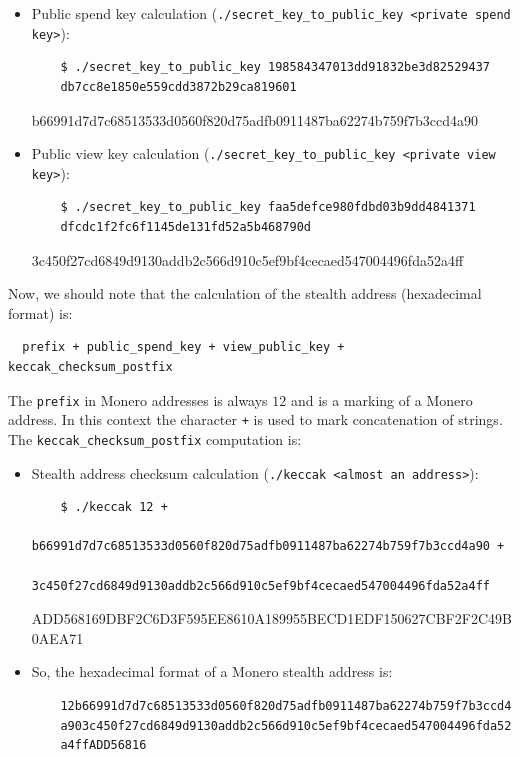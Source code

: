 \begin{itemize}
\begin{tcolorbox}[colback=green!5!white,colframe=green!65!black,title=Output:]
  \end{tcolorbox}
  \item Public spend key calculation (\verb|./secret_key_to_public_key <private spend key>|):
  \begin{verbatim}
    $ ./secret_key_to_public_key 198584347013dd91832be3d82529437
    db7cc8e1850e559cdd3872b29ca819601
  \end{verbatim}
  \begin{tcolorbox}[colback=green!5!white,colframe=green!65!black,title=Output:]
    \small{b66991d7d7c68513533d0560f820d75adfb0911487ba62274b759f7b3ccd4a90}
  \end{tcolorbox}
  \item Public view key calculation (\verb|./secret_key_to_public_key <private view key>|):
  \begin{verbatim}
    $ ./secret_key_to_public_key faa5defce980fdbd03b9dd4841371
    dfcdc1f2fc6f1145de131fd52a5b468790d
  \end{verbatim}
  \begin{tcolorbox}[colback=green!5!white,colframe=green!65!black,title=Output:]
    \small{3c450f27cd6849d9130addb2c566d910c5ef9bf4cecaed547004496fda52a4ff}
  \end{tcolorbox}
\end{itemize}

Now, we should note that the calculation of the stealth address (hexadecimal format) is:
\begin{verbatim}
  prefix + public_spend_key + view_public_key + keccak_checksum_postfix
\end{verbatim}
The \verb|prefix| in Monero addresses is always $12$ and is a marking of a Monero address. In this context the character \verb|+| is used to mark concatenation of strings. The \verb|keccak_checksum_postfix| computation is:
\begin{itemize}
  \item Stealth address checksum calculation (\verb|./keccak <almost an address>|):
  \begin{verbatim}
    $ ./keccak 12 +
    b66991d7d7c68513533d0560f820d75adfb0911487ba62274b759f7b3ccd4a90 +
    3c450f27cd6849d9130addb2c566d910c5ef9bf4cecaed547004496fda52a4ff
  \end{verbatim}
  \begin{tcolorbox}[colback=green!5!white,colframe=green!65!black,title=Output:]
    \footnotesize{ADD568169DBF2C6D3F595EE8610A189955BECD1EDF150627CBF2F2C49B0AEA71}
  \end{tcolorbox}
  \item So, the hexadecimal format of a Monero stealth address is:
  \begin{verbatim}
    12b66991d7d7c68513533d0560f820d75adfb0911487ba62274b759f7b3ccd4
    a903c450f27cd6849d9130addb2c566d910c5ef9bf4cecaed547004496fda52
    a4ffADD56816
  \end{verbatim}
\end{itemize}

